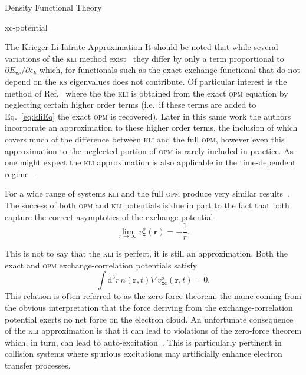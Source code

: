 \documentclass[letterpaper, 11 pt]{report}
\begin{document}
\begin{chapter}{Density Functional Theory \label{chap:dft}}
\begin{section}{xc-potential \label{sec:xcpot}}
\begin{subsection}{The Krieger-Li-Iafrate Approximation \label{sec:kli}}
         It should be noted that while several variations of the \textsc{kli} method exist~\cite{kli1,
         kli2, kli3} they differ by only a term proportional to $\partial E_\mathrm{xc} / \partial
         \epsilon_k$ which, for functionals such as the exact exchange functional that do not depend on
         the \textsc{ks} eigenvalues does not contribute. Of particular interest is the method of
         Ref.~\cite{kli2} where the the \textsc{kli} is obtained from the exact \textsc{opm} equation by
         neglecting certain higher order terms (i.e.\ if these terms are added to Eq.~\eqref{eq:kliEq}
         the exact \textsc{opm} is recovered). Later in this same work the authors incorporate an
         approximation to these higher order terms, the inclusion of which covers much of the difference
         between \textsc{kli} and the full \textsc{opm}, however even this approximation to the
         neglected portion of \textsc{opm} is rarely included in practice. As one might expect the
         \textsc{kli} approximation is also applicable in the time-dependent regime~\cite{tdkli1,
         tdkli2, tdkli3}.

         For a wide range of systems \textsc{kli} and the full \textsc{opm} produce very similar
         results~\cite{opm-rev}. The success of both \textsc{opm} and \textsc{kli} potentials is due in
         part to the fact that both capture the correct asymptotics of the exchange potential
         \begin{equation}
            \lim\limits_{r \rightarrow \infty} v_\mathrm{x}^\sigma (\mathbf{r}) = -\frac{1}{r}.
         \end{equation}

         This is not to say that the \textsc{kli} is perfect, it is still an approximation. Both the
         exact and \textsc{opm} exchange-correlation potentials satisfy
         \begin{equation} \label{eq:zft}
            \int \mathrm{d}^3 r \, n(\mathbf{r}, t) \nabla v^\sigma_\mathrm{xc}(\mathbf{r},t) = 0.
         \end{equation}
         This relation is often referred to as the zero-force theorem, the name coming from the obvious
         interpretation that the force deriving from the exchange-correlation potential exerts no net
         force on the electron cloud. An unfortunate consequence of the \textsc{kli} approximation is
         that it can lead to violations of the zero-force theorem which, in turn, can lead to
         auto-excitation~\cite{kli-zero-force}. This is particularly pertinent in collision systems
         where spurious excitations may artificially enhance electron transfer processes.

      \end{subsection}

   \end{section}

\end{chapter}
\end{document}
